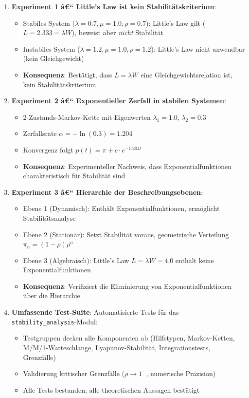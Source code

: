 ﻿\documentclass[a4paper,12pt]{report}
\theoremstyle{definition}
\begin{document}
\begin{enumerate}
	\item[-] \textbf{Experiment 1 â€“ Little's Law ist kein Stabilitätskriterium}:
	\begin{itemize}
		\item[-] Stabiles System ($\lambda = 0.7, \mu = 1.0, \rho = 0.7$): Little's Law gilt ($L = 2.333 = \lambda W$), beweist aber \textit{nicht} Stabilität
		\item[-] Instabiles System ($\lambda = 1.2, \mu = 1.0, \rho = 1.2$): Little's Law nicht anwendbar (kein Gleichgewicht)
		\item[-] \textbf{Konsequenz}: Bestätigt, dass $L = \lambda W$ eine Gleichgewichtsrelation ist, kein Stabilitätskriterium
	\end{itemize}
	
	\item[-] \textbf{Experiment 2 â€“ Exponentieller Zerfall in stabilen Systemen}:
	\begin{itemize}
		\item[-] 2-Zustands-Markov-Kette mit Eigenwerten $\lambda_1 = 1.0$, $\lambda_2 = 0.3$
		\item[-] Zerfallsrate $\alpha = -\ln(0.3) = 1.204$
		\item[-] Konvergenz folgt $p(t) = \pi + c \cdot e^{-1.204t}$
		\item[-] \textbf{Konsequenz}: Experimenteller Nachweis, dass Exponentialfunktionen charakteristisch für Stabilität sind
	\end{itemize}
	
	\item[-] \textbf{Experiment 3 â€“ Hierarchie der Beschreibungsebenen}:
	\begin{itemize}
		\item[-] Ebene 1 (Dynamisch): Enthält Exponentialfunktionen, ermöglicht Stabilitätsanalyse
		\item[-] Ebene 2 (Stationär): Setzt Stabilität voraus, geometrische Verteilung $\pi_n = (1-\rho)\rho^n$
		\item[-] Ebene 3 (Algebraisch): Little's Law $L = \lambda W = 4.0$ enthält keine Exponentialfunktionen
		\item[-] \textbf{Konsequenz}: Verifiziert die Eliminierung von Exponentialfunktionen über die Hierarchie
	\end{itemize}
	
	\item[-] \textbf{Umfassende Test-Suite}: Automatisierte Tests für das
	\texttt{stability\_analysis}-Modul:
	\begin{itemize}
		\item[-] Testgruppen decken alle Komponenten ab (Hilfstypen,
		Markov-Ketten, M/M/1-Warteschlange, Lyapunov-Stabilität,
		Integrationstests, Grenzfälle)
		\item[-] Validierung kritischer Grenzfälle ($\rho \to 1^-$,
		numerische Präzision)
		\item[-] Alle Tests bestanden; alle theoretischen Aussagen bestätigt
	\end{itemize}
\end{enumerate}
\end{document}
